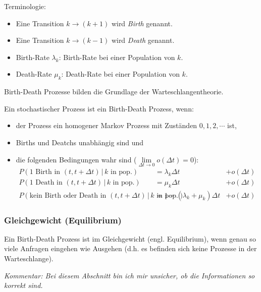 \documentclass[a4paper, 11pt, accentcolor = tud3b]{tudreport}
\providecommand{\forwhich}{\ensuremath{{\,\vert\,}}}
\begin{document}
				Terminologie:
				\begin{itemize}
					\item Eine Transition \( k \rightarrow (k + 1) \) wird \textit{Birth} genannt.
					\item Eine Transition \( k \rightarrow (k - 1) \) wird \textit{Death} genannt.
					\item Birth-Rate \( \lambda _ k \): Birth-Rate bei einer Population von \(k\).
					\item Death-Rate \( \mu _ k \): Death-Rate bei einer Population von \(k\).
				\end{itemize}
				
				Birth-Death Prozesse bilden die Grundlage der Warteschlangentheorie.
				
				Ein stochastischer Prozess ist ein Birth-Death Prozess, wenn:
				\begin{itemize}
					\item der Prozess ein homogener Markov Prozess mit Zuständen \( 0, 1, 2, \cdots \) ist,
					\item Births und Deatchs unabhängig sind und
					\item die folgenden Bedingungen wahr sind (\( \lim\limits _ { \Delta t \to 0 } o(\Delta t) = 0 \)): 
						\begin{align*}
							P(1 \text{ Birth in } (t, t + \Delta t) \forwhich k \text{ in pop.})              & = \lambda _ k \Delta t                 & + o(\Delta t) \\
							P(1 \text{ Death in } (t, t + \Delta t) \forwhich k \text{ in pop.})              & = \mu _ k \Delta t                     & + o(\Delta t) \\
							P(\text{kein Birth oder Death in } (t, t + \Delta t) \forwhich k \text{ in pop.}) & = 1 - (\lambda _ k + \mu _ k) \Delta t & + o(\Delta t)
						\end{align*}
				\end{itemize}
				
				\subsubsection{Gleichgewicht (Equilibrium)} %
					Ein Birth-Death Prozess ist im Gleichgewicht (engl. Equilibrium), wenn genau so viele Anfragen eingehen wie Ausgehen (d.h. es befinden sich keine Prozesse in der Warteschlange).
					
					\textit{Kommentar: Bei diesem Abschnitt bin ich mir unsicher, ob die Informationen so korrekt sind.} 
				
\end{document}

